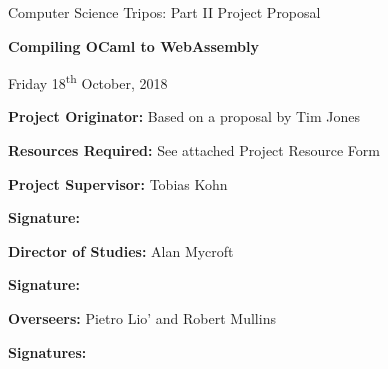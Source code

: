 \documentclass[12pt]{article}
\begin{document}
	
	\thispagestyle{empty}
	
	\medskip
	\medskip
	
	\vfil
	
	\centerline{\large Computer Science Tripos: Part II Project Proposal}
	\vspace{0.4in}
	\centerline{\Large\bf Compiling OCaml to WebAssembly}
	\vspace{0.3in}
	\centerline{\large{Friday 18\textsuperscript{th} October, 2018}}
	
	\vfil
	
	{\bf Project Originator:} Based on a proposal by Tim Jones
	
	\vspace{0.1in}
	
	{\bf Resources Required:} See attached Project Resource Form
	
	\vspace{0.5in}
	
	{\bf Project Supervisor:} Tobias Kohn
	
	\vspace{0.2in}
	
	{\bf Signature:}
	
	\vspace{0.5in}
	
	{\bf Director of Studies:}  Alan Mycroft
	
	\vspace{0.2in}
	
	{\bf Signature:}
	
	\vspace{0.5in}
	
	{\bf Overseers:} Pietro Lio' and Robert Mullins
	
	\vspace{0.2in}
	
	{\bf Signatures:} 
	
	\vfil
	\eject
	
	
\end{document}
